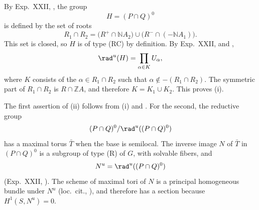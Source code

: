 By Exp.\ XXII, , the group
\[
 H=(P\cap Q)^0
\]
is defined by the set of roots
\[
 R_1\cap R_2
 =
 \bigl(R^+\cap\mathbb N A_2\bigr)
 \cup
 \bigl(R^-\cap(-\mathbb N A_1)\bigr).
\]
This set is closed, so \(H\) is of type \textup{(RC)} by definition.
By Exp.\ XXII,  and ,
\[
 \rad^u(H)=\prod_{\alpha\in K}U_\alpha,
\]
where \(K\) consists of the \(\alpha\in R_1\cap R_2\) such that
\(\alpha\notin-(R_1\cap R_2)\).  The symmetric part of
\(R_1\cap R_2\) is \(R\cap\mathbb ZA\), and therefore
\(K=K_1\cup K_2\).  This proves \textup{(i)}.

The first assertion of \textup{(ii)} follows from \textup{(i)} and
.  For the second, the reductive group
\[
 (P\cap Q)^0/\rad^u((P\cap Q)^0)
\]
has a maximal torus \(\bar T\) when the base is semilocal.  The inverse
image \(N\) of \(\bar T\) in \((P\cap Q)^0\) is a subgroup of type
\textup{(R)} of \(G\), with solvable fibers, and
\[
 N^u=\rad^u((P\cap Q)^0)
\]
(Exp.\ XXII, ).  The scheme of maximal tori of \(N\) is a
principal homogeneous bundle under \(N^u\) (loc.\ cit., ), and
therefore has a section because \(H^1(S,N^u)=0\).
\SGAQED
